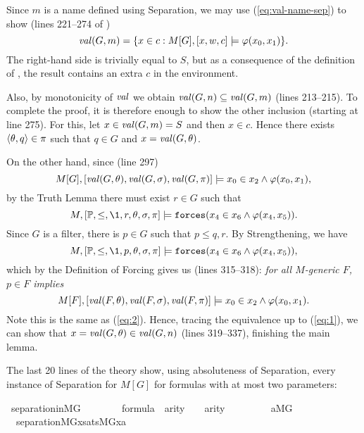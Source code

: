 Since $m$ is a name defined using Separation, we may use
(\ref{eq:val-name-sep}) to show (lines 221--274 of
)
\begin{equation}
  \label{eq:val-of-m}
  \operatorname{\mathit{val}}(G,m) = \{x\in c : M[G],[x,w,c]\models \varphi(x_0,x_1)\}.
\end{equation}
The right-hand side is trivially equal to $S$, but as a consequence of
the definition of 
, the result contains an extra $c$ in the
environment.

Also, by monotonicity of $\operatorname{\mathit{val}}$ we obtain 
  $\operatorname{\mathit{val}}(G,n)\subseteq \operatorname{\mathit{val}}(G,m)$ (lines 213--215).
To complete the proof, it is therefore enough to show the other
inclusion (starting at line 275).
For this, let $x\in \operatorname{\mathit{val}}(G,m) = S$ and then $x\in c$. Hence there exists
$\langle\theta,q\rangle\in\pi$ such that $q\in G$ and $x=\operatorname{\mathit{val}}(G,\theta)$. 

On the other hand, since (line 297)
\[
M[G],[\operatorname{\mathit{val}}(G,\theta),\operatorname{\mathit{val}}(G,\sigma),\operatorname{\mathit{val}}(G,\pi)]\models
 x_0\in x_2\wedge\varphi( x_0, x_1),
\]
by the  Truth Lemma there must exist $r\in G$ such that
\[
M,[\PP,\leq,\1,r,\th,\sig,\pi]\models
\forceisa(x_4\in x_6\y\phi( x_4, x_5)).
\]
Since $G$ is a filter, there is $p\in G$ such that $p\leq q, r$.
By Strengthening, we have
\[
M,[\PP,\leq,\1,p,\th,\sig,\pi]\models
\forceisa(x_4\in x_6\y \phi( x_4, x_5)),
\]
which by the Definition of Forcing gives us (lines 315--318): \emph{for all $M$-generic $F$,
  $p\in F$ implies} 
\[
M[F],[\operatorname{\mathit{val}}(F,\theta),\operatorname{\mathit{val}}(F,\sigma),\operatorname{\mathit{val}}(F,\pi)]\models
 x_0\in  x_2 \wedge\varphi( x_0, x_1).
\]
Note this is the same as (\ref{eq:2}). Hence, tracing the equivalence
up to (\ref{eq:1}), we can show that $x=\operatorname{\mathit{val}}(G,\theta)\in \operatorname{\mathit{val}}(G,n)$
(lines 319--337), finishing the main lemma.

The last 20 lines of the theory show, using absoluteness of
Separation, every instance of Separation for $M[G]$ for formulas with
at most two parameters:

\begin{isabelle}
\isamarkupfalse%
\ separation{\isacharunderscore}in{\isacharunderscore}MG{\isacharcolon}\isanewline
\ \ \ \isanewline
\ \ \ \ {\isachardoublequoteopen}{\isasymphi}{\isasymin}formula{\isachardoublequoteclose}\ \ {\isachardoublequoteopen}arity{\isacharparenleft}{\isasymphi}{\isacharparenright}\ {\isacharequal}\ {}\ {\isasymor}\ arity{\isacharparenleft}{\isasymphi}{\isacharparenright}{\isacharequal}{}{\isachardoublequoteclose}\isanewline
\ \ \ \ \isanewline
\ \ \ \ {\isachardoublequoteopen}{\isasymforall}a{\isasymin}{\isacharparenleft}M{\isacharbrackleft}G{\isacharbrackright}{\isacharparenright}{\isachardot} \ \  separation{\isacharparenleft}{\isacharhash}{\isacharhash}M{\isacharbrackleft}G{\isacharbrackright}{\isacharcomma}{\isasymlambda}x{\isachardot}sats{\isacharparenleft}M{\isacharbrackleft}G{\isacharbrackright}{\isacharcomma}{\isasymphi}{\isacharcomma}{\isacharbrackleft}x{\isacharcomma}a{\isacharbrackright}{\isacharparenright}{\isacharparenright}{\isachardoublequoteclose}
\end{isabelle}
   
